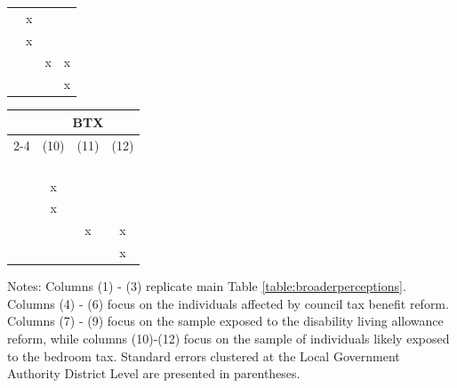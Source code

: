 \documentclass[[a4paper,11pt]{article}
\begin{document}
\begin{landscape}
\begin{table}[!htb]
{\begin{minipage}{.22\linewidth}
\begin{tabular}{l*{3}{c}}
  & x & & \\
    & x & & \\
  & & x  &  x  \\
 &  & & x \\

\bottomrule
\end{tabular}
\end{minipage}

       \begin{minipage}{.22\linewidth}
      \centering
\begin{tabular}{l*{3}{c}}
\toprule
                                      	& \multicolumn{3}{c}{BTX}    \\
                                                      \cmidrule(lr){2-4}                                   
                                                                         &\multicolumn{1}{c}{(10)}   &\multicolumn{1}{c}{(11)}   &\multicolumn{1}{c}{(12)}    \\ 
\midrule
  \\
  
\addlinespace
\addlinespace

 \\

\addlinespace
\addlinespace
 \\

\addlinespace
\addlinespace
 \\

\addlinespace

  & x & & \\
    & x & & \\
  & & x  &  x  \\
 &  & & x \\

\bottomrule
\end{tabular}
\end{minipage}

    }
\addlinespace
\footnotesize{
Notes: Columns (1) - (3) replicate main Table \ref{table:broaderperceptions}.  Columns (4) - (6) focus on the individuals affected by council tax benefit reform. Columns (7) - (9) focus on the sample exposed to the disability living allowance reform, while columns (10)-(12) focus on the sample of individuals likely exposed to the bedroom tax. Standard errors clustered at the Local Government Authority District Level are presented in parentheses.} 

\end{table}

\end{landscape}
\end{document}
